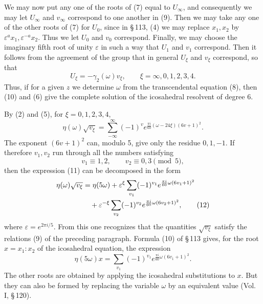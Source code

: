 \documentclass[11pt]{article}
\providecommand{\eps}{\varepsilon}
\providecommand{\eps}{\varepsilon}
\begin{document}
We may now put any one of the roots of (7) equal to \(U_\infty\), and consequently we may let \(U_\infty\) and \(v_\infty\) correspond to one another in (9). Then we may take any one of the other roots of (7) for \(U_0\), since in \S\,113, (4) we may replace \(x_1,x_2\) by \(\eps^a x_1,\eps^{-a}x_2\). Thus we let \(U_0\) and \(v_0\) correspond. Finally, we may choose the imaginary fifth root of unity \(\eps\) in such a way that \(U_1\) and \(v_1\) correspond. Then it follows from the agreement of the group that in general \(U_\xi\) and \(v_\xi\) correspond, so that
\begin{equation}
U_\xi=-\gamma_2(\omega)v_\xi,
\qquad
\xi=\infty,0,1,2,3,4.
\tag{10}
\end{equation}
Thus, if for a given \(z\) we determine \(\omega\) from the transcendental equation (8), then (10) and (6) give the complete solution of the icosahedral resolvent of degree 6.

By (2) and (5), for \(\xi=0,1,2,3,4\),
\begin{equation}
\eta(\omega)\sqrt{v_\xi}=\sum_{-\infty}^{\infty}(-1)^v e^{\frac{\pi i}{60}(\omega-24\xi)(6v+1)^2}.
\tag{11}
\end{equation}
The exponent \((6v+1)^2\) can, modulo 5, give only the residue \(0,1,-1\). If therefore \(v_1,v_2\) run through all the numbers satisfying
\[
v_1\equiv1,2,
\qquad
v_2\equiv0,3\pmod 5,
\]
then the expression (11) can be decomposed in the form
\begin{align}
\eta(\omega)\sqrt{v_\xi}&=\eta(5\omega)+\eps^\xi\sum_{v_1}(-1)^{v_1}e^{\frac{\pi i}{60}\omega(6v_1+1)^2}\notag\\
&\quad+\eps^{-\xi}\sum_{v_2}(-1)^{v_2}e^{\frac{\pi i}{60}\omega(6v_2+1)^2},
\tag{12}
\end{align}
where \(\eps=e^{2\pi i/5}\). From this one recognizes that the quantities \(\sqrt{v_\xi}\) satisfy the relations (9) of the preceding paragraph. Formula (10) of \S\,113 gives, for the root \(x=x_1:x_2\) of the icosahedral equation, the expression
\begin{equation}
\eta(5\omega)x=\sum_{v_1}(-1)^{v_1}e^{\frac{\pi i}{60}\omega(6v_1+1)^2}.
\tag{13}
\end{equation}
The other roots are obtained by applying the icosahedral substitutions to \(x\). But they can also be formed by replacing the variable \(\omega\) by an equivalent value (Vol. I, \S\,120).
\end{document}
